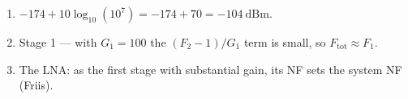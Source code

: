 \begin{enumerate}[leftmargin=1.6em,itemsep=2pt]
\item $-174 + 10\log_{10}(10^{7}) = -174 + 70 = -104\ \text{dBm}$.
\item Stage 1 --- with $G_1 = 100$ the $(F_2-1)/G_1$ term is small, so $F_{\text{tot}} \approx F_1$.
\item The LNA: as the first stage with substantial gain, its NF sets the system NF (Friis).
\end{enumerate}

